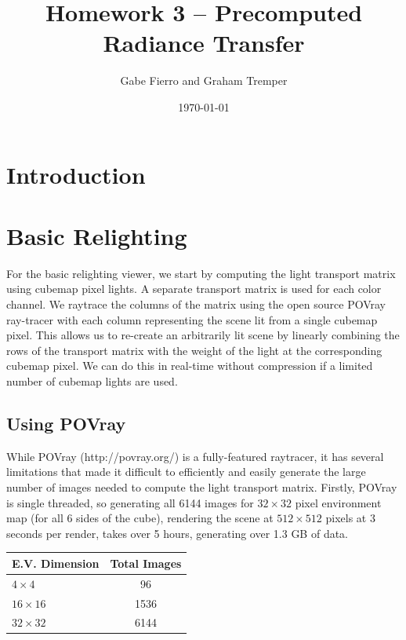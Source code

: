 \documentclass[11pt]{article}
\begin{document}
\title{Homework 3 -- Precomputed Radiance Transfer}
\author{Gabe Fierro and Graham Tremper}
\date{\today}
\maketitle

\section{Introduction}

\section{Basic Relighting}

For the basic relighting viewer, we start by computing the light transport
matrix using cubemap pixel lights. A separate transport matrix is used for each
color channel. We raytrace the columns of the matrix using the open source
POVray ray-tracer with each column representing the scene lit from a single
cubemap pixel. This allows us to re-create an arbitrarily lit scene by linearly
combining the rows of the transport matrix with the weight of the light at the
corresponding cubemap pixel. We can do this in real-time without compression if
a limited number of cubemap lights are used.

\subsection{Using POVray}

While POVray (http://povray.org/) is a fully-featured raytracer, it has several
limitations that made it difficult to efficiently and easily generate the large
number of images needed to compute the light transport matrix. Firstly, POVray
is single threaded, so generating all 6144 images for $32\times 32$ pixel
environment map (for all 6 sides of the cube), rendering the scene at
$512\times 512$ pixels at 3 seconds per render, takes over 5 hours, generating
over 1.3 GB of data.

\begin{center}
\begin{tabular}{|l|c|}
 \hline
 E.V. Dimension & Total Images\\
 \hline
 $4\times 4$ & 96 \\
 $16\times 16$ & 1536 \\
 $32\times 32$ & 6144 \\
 \hline
\end{tabular}
\end{center}
\end{document}
